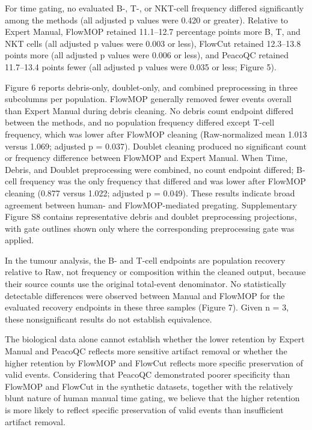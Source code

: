 \documentclass[
  11pt,
  a4paper,
]{article}
\begin{document}
For time gating, no evaluated B-, T-, or NKT-cell frequency differed
significantly among the methods (all adjusted p values were 0.420 or
greater). Relative to Expert Manual, FlowMOP retained 11.1--12.7
percentage points more B, T, and NKT cells (all adjusted p values were
0.003 or less), FlowCut retained 12.3--13.8 points more (all adjusted p
values were 0.006 or less), and PeacoQC retained 11.7--13.4 points fewer
(all adjusted p values were 0.035 or less; Figure 5).

Figure 6 reports debris-only, doublet-only, and combined preprocessing
in three subcolumns per population. FlowMOP generally removed fewer
events overall than Expert Manual during debris cleaning. No debris
count endpoint differed between the methods, and no population frequency
differed except T-cell frequency, which was lower after FlowMOP cleaning
(Raw-normalized mean 1.013 versus 1.069; adjusted p = 0.037). Doublet
cleaning produced no significant count or frequency difference between
FlowMOP and Expert Manual. When Time, Debris, and Doublet preprocessing
were combined, no count endpoint differed; B-cell frequency was the only
frequency that differed and was lower after FlowMOP cleaning (0.877
versus 1.022; adjusted p = 0.049). These results indicate broad
agreement between human- and FlowMOP-mediated pregating. Supplementary
Figure S8 contains representative debris and doublet preprocessing
projections, with gate outlines shown only where the corresponding
preprocessing gate was applied.

In the tumour analysis, the B- and T-cell endpoints are population
recovery relative to Raw, not frequency or composition within the
cleaned output, because their source counts use the original total-event
denominator. No statistically detectable differences were observed
between Manual and FlowMOP for the evaluated recovery endpoints in these
three samples (Figure 7). Given n = 3, these nonsignificant results do
not establish equivalence.

The biological data alone cannot establish whether the lower retention
by Expert Manual and PeacoQC reflects more sensitive artifact removal or
whether the higher retention by FlowMOP and FlowCut reflects more
specific preservation of valid events. Considering that PeacoQC
demonstrated poorer specificity than FlowMOP and FlowCut in the
synthetic datasets, together with the relatively blunt nature of human
manual time gating, we believe that the higher retention is more likely
to reflect specific preservation of valid events than insufficient
artifact removal.
\end{document}
